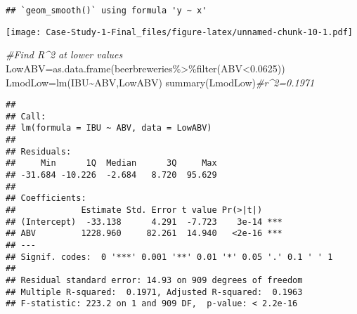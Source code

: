 \documentclass[
]{article}
\newenvironment{Shaded}{\begin{snugshade}}{\end{snugshade}}
\newcommand{\CommentTok}[1]{\textcolor[rgb]{0.56,0.35,0.01}{\textit{#1}}}
\newcommand{\FloatTok}[1]{\textcolor[rgb]{0.00,0.00,0.81}{#1}}
\newcommand{\FunctionTok}[1]{\textcolor[rgb]{0.00,0.00,0.00}{#1}}
\newcommand{\NormalTok}[1]{#1}
\newcommand{\OtherTok}[1]{\textcolor[rgb]{0.56,0.35,0.01}{#1}}
\newcommand{\SpecialCharTok}[1]{\textcolor[rgb]{0.00,0.00,0.00}{#1}}
\begin{document}
\begin{verbatim}
## `geom_smooth()` using formula 'y ~ x'
\end{verbatim}

\texttt{[image: Case-Study-1-Final\_files/figure-latex/unnamed-chunk-10-1.pdf]}

\begin{Shaded}
\begin{Highlighting}[]
\CommentTok{\#Find R\^{}2 at lower values}
\NormalTok{LowABV}\OtherTok{=}\FunctionTok{as.data.frame}\NormalTok{(beerbreweries}\SpecialCharTok{\%\textgreater{}\%}\FunctionTok{filter}\NormalTok{(ABV}\SpecialCharTok{\textless{}}\FloatTok{0.0625}\NormalTok{))}
\NormalTok{LmodLow}\OtherTok{=}\FunctionTok{lm}\NormalTok{(IBU}\SpecialCharTok{\textasciitilde{}}\NormalTok{ABV,LowABV)}
\FunctionTok{summary}\NormalTok{(LmodLow)}\CommentTok{\#r\^{}2=0.1971}
\end{Highlighting}
\end{Shaded}

\begin{verbatim}
## 
## Call:
## lm(formula = IBU ~ ABV, data = LowABV)
## 
## Residuals:
##     Min      1Q  Median      3Q     Max 
## -31.684 -10.226  -2.684   8.720  95.629 
## 
## Coefficients:
##             Estimate Std. Error t value Pr(>|t|)    
## (Intercept)  -33.138      4.291  -7.723    3e-14 ***
## ABV         1228.960     82.261  14.940   <2e-16 ***
## ---
## Signif. codes:  0 '***' 0.001 '**' 0.01 '*' 0.05 '.' 0.1 ' ' 1
## 
## Residual standard error: 14.93 on 909 degrees of freedom
## Multiple R-squared:  0.1971, Adjusted R-squared:  0.1963 
## F-statistic: 223.2 on 1 and 909 DF,  p-value: < 2.2e-16
\end{verbatim}
\end{document}
